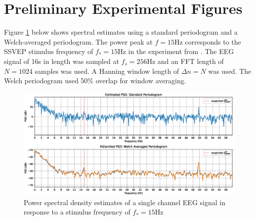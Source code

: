 \section{Preliminary Experimental Figures}
Figure \ref{fig:psd-1} below shows spectral estimates using a standard periodogram and a Welch-averaged periodogram. The power peak at $f=15$Hz corresponds to the SSVEP stimulus frequency of $f_*=15$Hz in the experiment from \cite{Acampora2021}. The EEG signal of 16s in length was sampled at $f_s=256$Hz and an FFT length of $N=1024$ samples was used. A Hanning window length of $\Delta n=N$ was used. The Welch periodogram used 50\% overlap for window averaging.
\begin{figure}[h]
\centering
\includegraphics[width=\textwidth]{psd_plot}
\caption{Power spectral density estimates of a single channel EEG signal in response to a stimulus frequency of $f_*=15$Hz}
\label{fig:psd-1}
\end{figure}
